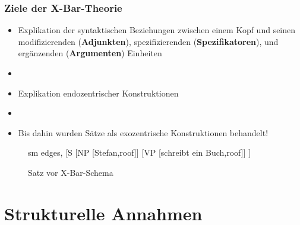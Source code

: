 \begin{frame}
\frametitle{Ziele der X-Bar-Theorie}

\begin{itemize}
	\item Explikation der syntaktischen Beziehungen zwischen einem Kopf und seinen modifizierenden (\textbf{Adjunkten}), spezifizierenden (\textbf{Spezifikatoren}), und ergänzenden (\textbf{Argumenten}) Einheiten
	\item[]
	\item Explikation endozentrischer Konstruktionen
	\item[]
	\item Bis dahin wurden Sätze als exozentrische Konstruktionen behandelt!
\end{itemize}

\begin{figure}[b]
	\begin{minipage}[b]{0.05\textwidth}
	\end{minipage} 
	\begin{minipage}[b]{0.50\textwidth}
	\centering
	\footnotesize{
		\begin{forest}
		sm edges,
		[S	[NP [Stefan,roof]]
			[VP [schreibt ein Buch,roof]]
		]
		\end{forest}
		}
		\caption{Satz vor X-Bar-Schema}	
  	\end{minipage}  
	\begin{minipage}[b]{0.05\textwidth}
  	\end{minipage}
  	
\end{figure}

\end{frame}


\section{Strukturelle Annahmen}

